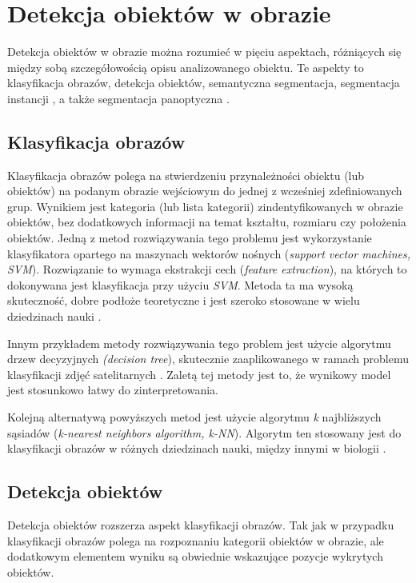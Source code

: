\section{Detekcja obiektów w obrazie}
\label{sec:typy_detekcji}

Detekcja obiektów w obrazie można rozumieć w pięciu aspektach, różniących się między sobą szczegółowością opisu analizowanego obiektu. Te aspekty to klasyfikacja obrazów, detekcja obiektów, semantyczna segmentacja, segmentacja instancji \cite{survey-of-object-classification}, a także segmentacja panoptyczna \cite{panoptic-segmentation}.

\subsection*{Klasyfikacja obrazów}
Klasyfikacja obrazów polega na stwierdzeniu przynależności obiektu (lub obiektów) na podanym obrazie wejściowym do jednej z wcześniej zdefiniowanych grup. Wynikiem jest kategoria (lub lista kategorii) zindentyfikowanych w obrazie obiektów, bez dodatkowych informacji na temat kształtu, rozmiaru czy położenia obiektów. Jedną z metod rozwiązywania tego problemu jest wykorzystanie klasyfikatora opartego na maszynach wektorów nośnych (\textit{support vector machines, SVM}). Rozwiązanie to wymaga ekstrakcji cech (\textit{feature extraction}), na których to dokonywana jest klasyfikacja przy użyciu \textit{SVM}. Metoda ta ma wysoką skuteczność, dobre podłoże teoretyczne i jest szeroko stosowane w wielu dziedzinach nauki \cite{analysis-image-classification}.

Innym przykładem metody rozwiązywania tego problem jest użycie algorytmu drzew decyzyjnych \textit{(decision tree}), skutecznie zaaplikowanego w ramach problemu klasyfikacji zdjęć satelitarnych \cite{decision-image-classifier}. Zaletą tej metody jest to, że wynikowy model jest stosunkowo łatwy do zinterpretowania.

Kolejną alternatywą powyższych metod jest użycie algorytmu \textit{k} najbliższych sąsiadów (\textit{k-nearest neighbors algorithm, k-NN}). Algorytm ten stosowany jest do klasyfikacji obrazów w różnych dziedzinach nauki, między innymi w biologii \cite{analysis-image-classification}.

\subsection*{Detekcja obiektów}
Detekcja obiektów rozszerza aspekt klasyfikacji obrazów. Tak jak w przypadku klasyfikacji obrazów polega na rozpoznaniu kategorii obiektów w obrazie, ale dodatkowym elementem wyniku są obwiednie wskazujące pozycje wykrytych obiektów.
\cite{survey-deep-learning-object-dection}

